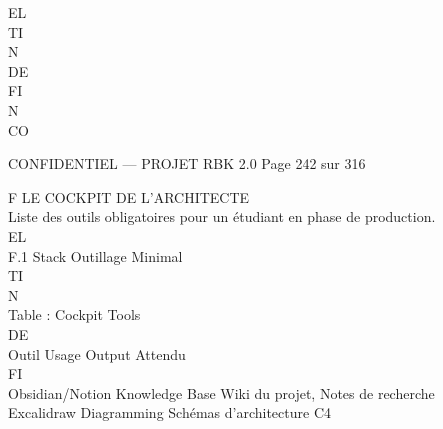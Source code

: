 EL\\
TI\\
N\\
DE\\
FI\\
N\\
CO\\
\vspace{0.5em}
\vspace{0.5em}
\vspace{0.5em}
\vspace{0.5em}
\begin{confidential}CONFIDENTIEL — PROJET RBK 2.0                                           Page 242 sur 316\end{confidential}
F \textbar{} LE COCKPIT DE L’ARCHITECTE\\
\vspace{0.5em}
\vspace{0.5em}
Liste des outils obligatoires pour un étudiant en phase de production.\\
\vspace{0.5em}
\vspace{0.5em}
\vspace{0.5em}
\vspace{0.5em}
EL\\
F.1 Stack Outillage Minimal\\
\vspace{0.5em}
\vspace{0.5em}
\vspace{0.5em}
\vspace{0.5em}
TI\\
N\\
Table : Cockpit Tools\\
\vspace{0.5em}
\vspace{0.5em}
\vspace{0.5em}
\vspace{0.5em}
DE\\
Outil           Usage           Output Attendu\\
\vspace{0.5em}
\vspace{0.5em}
\vspace{0.5em}
\vspace{0.5em}
FI\\
Obsidian/Notion Knowledge Base Wiki du projet, Notes de recherche\\
Excalidraw      Diagramming     Schémas d’architecture C4\\
\vspace{0.5em}
